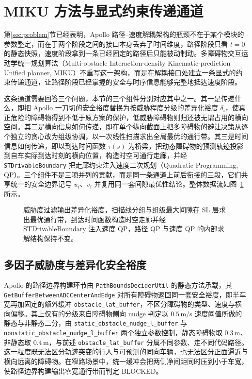 \documentclass[a4paper,11pt]{ctexart}
\theoremstyle{definition}
\begin{document}

\section{MIKU 方法与显式约束传递通道}
\label{sec:method}

第\ref{sec:problem}节已经表明，Apollo 路径--速度解耦架构的瓶颈不在于某个模块的参数整定，而在于两个阶段之间的接口本身丢弃了时间维度，路径阶段只看 $t=0$ 的静态快照，速度阶段拿到一条已经固定的路径后只能被动制动。多障碍物交互运动学统一规划算法（Multi-obstacle Interaction-density Kinematic-prediction Unified planner, MIKU）不重写这一架构，而是在解耦接口处建立一条显式的约束传递通道，让路径阶段已经掌握的安全与时序信息能够完整地抵达速度阶段。

这条通道需要回答三个问题，本节的三个组件分别对应其中之一。其一是传递什么，即把 Apollo 一刀切的安全裕度替换为按威胁程度分级的差异化裕度 $\delta_i$，使真正危险的障碍物得到不低于原方案的保护，低威胁障碍物则归还被无谓占用的横向空间。其二是横向信息如何传递，即在单个纵向截面上把多障碍物的避让决策从逐个独立的贪心改为组级协调，以一次线性扫描求出全局最优的通行带。其三是时间信息如何传递，即以到达时间函数 $\tau(s)$ 为桥梁，把动态障碍物的预测轨迹投影到自车实际到达时刻的横向位置，构造时空可通行走廊，并经 \texttt{STDrivableBoundary} 把走廊约束注入速度二次规划（Quadratic Programming, QP）。三个组件不是三项并列的贡献，而是同一条通道上前后衔接的三段，它们共享统一的安全边界记号 $u_i$、$v_i$ 并复用同一套间隙最优性结论。整体数据流如图~\ref{fig:algorithm_flow} 所示。

\begin{figure}[htbp]
\centering
{}
\caption{MIKU 显式约束传递通道的整体数据流}
\caption*{威胁度过滤输出差异化裕度，扫描线分组与组级最大间隙在 SL 层求出最优通行带，到达时间函数构造时空走廊并经 STDrivableBoundary 注入速度 QP，路径 QP 与速度 QP 的内部求解结构保持不变。}
\label{fig:algorithm_flow}
\end{figure}

\subsection{多因子威胁度与差异化安全裕度}
\label{sec:method_threat}

Apollo 的路径边界构建环节由 \texttt{PathBoundsDeciderUtil} 的静态方法承载，其 \texttt{GetBufferBetweenADCCenterAndEdge} 对所有障碍物返回同一套安全裕度，即半车宽再加固定的额外缓冲 \texttt{obstacle\_lat\_buffer}，不区分障碍物的类型、速度与横向偏移。其上仅有的分级来自障碍物侧向 nudge 判定以 $0.5$\,m/s 速度阈值所做的静态与非静态二分，由 \texttt{static\_obstacle\_nudge\_l\_buffer} 与 \texttt{nonstatic\_obstacle\_nudge\_l\_buffer} 两个独立参数控制，静态障碍物取 $0.3$\,m、非静态取 $0.4$\,m，与前述 \texttt{obstacle\_lat\_buffer} 分属不同参数、走不同代码路径。这一粒度既无法区分轨迹突变的行人与可预测的同向车辆，也无法区分正面逼近与横向远离的障碍物。在窄路场景中，统一缓冲会把两侧净间距同时压到小于车宽，使路径边界构建输出零宽通行带而判定 BLOCKED。
\end{document}
